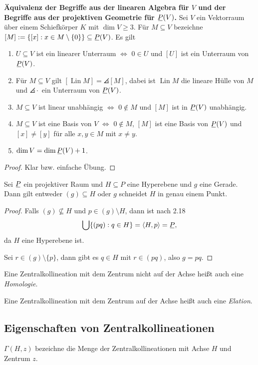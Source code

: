 \textbf{Äquivalenz der Begriffe aus der linearen Algebra für $V$ und der Begriffe aus der projektiven Geometrie für $\proj(V)$.}
Sei $V$ ein Vektorraum über einem Schiefkörper $K$ mit $\dim V \ge 3$. Für $M \subseteq V$ bezeichne $[M] := \{ [x] : x \in M \setminus\{ 0 \} \} \subseteq \proj(V)$. Es gilt
\begin{enumerate}
 \item $U \subseteq V$ ist ein linearer Unterraum $\Leftrightarrow$ $0 \in U$ und $[U]$ ist ein Unterraum von $\proj(V)$.
 \item Für $M \subseteq V$ gilt $[ \operatorname{Lin} M ] = \angles{[M]}$, dabei ist $\operatorname{Lin} M$ die lineare Hülle von $M$ und $\angles{\cdot}$ ein Unterraum von $\proj(V)$.
 \item $M \subseteq V$ ist linear unabhängig $\Leftrightarrow$ $0 \notin M$ und $[M]$ ist in $\proj(V)$ unabhängig.
 \item $M \subseteq V$ ist eine Basis von $V$ $\Leftrightarrow$ $0 \notin M$, $[M]$ ist eine Basis von $\proj(V)$ und $[x] \ne [y]$ für alle $x,y \in M$ mit $x \ne y$.
 \item $\dim V = \dim \proj(V) + 1$.
\end{enumerate}

\begin{proof}
 Klar bzw. einfache Übung.
\end{proof}

\begin{rmrk*}
 Sei $\proj$ ein projektiver Raum und $H \subseteq P$ eine Hyperebene und $g$ eine Gerade. Dann gilt entweder $(g) \subseteq H$ oder $g$ schneidet $H$ in genau einem Punkt.
\end{rmrk*}

\begin{proof}
 Falls $(g) \nsubseteq H$ und $p \in (g) \setminus H$, dann ist nach 2.18
 \[ \bigcup \{ (pq) : q \in H \} = \angles{H,p} = \proj, \]
 da $H$ eine Hyperebene ist. 
 
 Sei $r \in (g) \setminus \{p\}$, dann gibt es $q \in H$ mit $r \in (pq)$, also $g = pq$.
\end{proof}

\begin{defn*}
 Eine Zentralkollineation mit dem Zentrum nicht auf der Achse heißt auch eine \emph{Homologie}. 
 
 Eine Zentralkollineation mit dem Zentrum auf der Achse heißt auch eine \emph{Elation}.
\end{defn*}

\subsection{Eigenschaften von Zentralkollineationen}
\begin{deno*}
 $\Gamma(H,z)$ bezeichne die Menge der Zentralkollineationen mit Achse $H$ und Zentrum $z$.
\end{deno*}

